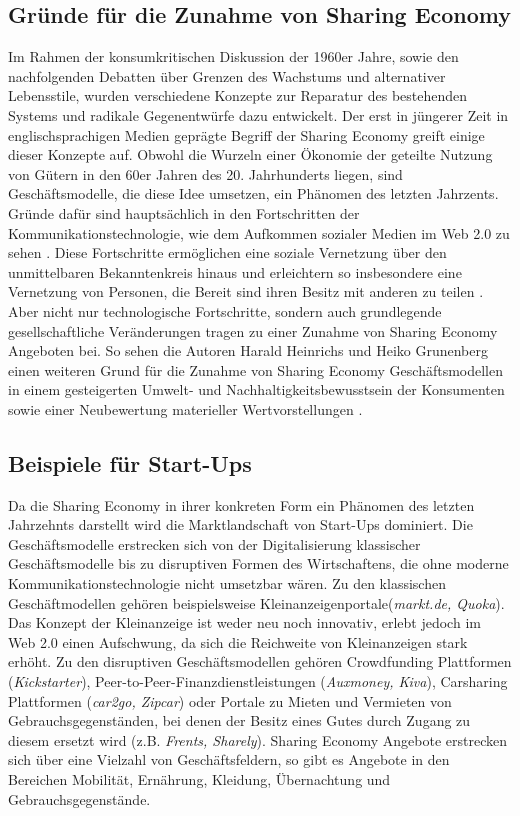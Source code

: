 \documentclass[a4paper]{scrartcl}
\begin{document}
\begin{multicols}{2}
		\subsection{Gr\"unde f\"ur die Zunahme von Sharing Economy}
			Im Rahmen der konsumkritischen Diskussion der 1960er Jahre, sowie den nachfolgenden Debatten über Grenzen des Wachstums und alternativer Lebensstile, wurden verschiedene Konzepte zur Reparatur des bestehenden Systems und radikale Gegenentw\"urfe dazu entwickelt\cite{heinrichs2012}. Der erst in jüngerer Zeit in englischsprachigen Medien gepr\"agte Begriff der Sharing Economy greift einige dieser Konzepte auf. Obwohl die Wurzeln einer \"Okonomie der geteilte Nutzung von G\"utern in den 60er Jahren des 20. Jahrhunderts liegen, sind Gesch\"aftsmodelle, die diese Idee umsetzen, ein Ph\"anomen des letzten Jahrzents. Gr\"unde daf\"ur sind haupts\"achlich in den Fortschritten der Kommunikationstechnologie, wie dem Aufkommen sozialer Medien im Web 2.0 zu sehen \cite{doi:10.1002/asi.23552, heinrichs2012}. Diese Fortschritte erm\"oglichen eine  soziale Vernetzung \"uber den unmittelbaren Bekanntenkreis hinaus und erleichtern so insbesondere eine Vernetzung von Personen, die Bereit sind ihren Besitz mit anderen zu teilen \cite{matzler2014}. Aber nicht nur technologische Fortschritte, sondern auch grundlegende gesellschaftliche Ver\"anderungen tragen zu einer Zunahme von Sharing Economy Angeboten bei. So sehen die Autoren Harald Heinrichs und Heiko Grunenberg einen weiteren Grund f\"ur die Zunahme von Sharing Economy Gesch\"aftsmodellen in einem gesteigerten Umwelt- und Nachhaltigkeitsbewusstsein der Konsumenten sowie einer Neubewertung materieller Wertvorstellungen \cite{heinrichs2012}.
	
		\subsection{Beispiele f\"ur Start-Ups}
			Da die Sharing Economy in ihrer konkreten Form ein Ph\"anomen des letzten Jahrzehnts darstellt wird die Marktlandschaft von Start-Ups dominiert. Die Gesch\"aftsmodelle erstrecken sich von der Digitalisierung klassischer Gesch\"aftsmodelle bis zu disruptiven Formen des Wirtschaftens, die ohne moderne Kommunikationstechnologie nicht umsetzbar w\"aren. Zu den klassischen Gesch\"aftmodellen geh\"oren beispielsweise Kleinanzeigenportale(\textit{markt.de, Quoka}). Das Konzept der Kleinanzeige ist weder neu noch innovativ, erlebt jedoch im Web 2.0 einen Aufschwung, da sich die Reichweite von Kleinanzeigen stark erh\"oht. Zu den disruptiven Gesch\"aftsmodellen geh\"oren Crowdfunding Plattformen (\textit{Kickstarter}), Peer-to-Peer-Finanzdienstleistungen (\textit{Auxmoney, Kiva}), Carsharing Plattformen (\textit{car2go, Zipcar}) oder Portale zu Mieten und Vermieten von Gebrauchsgegenst\"anden, bei denen der Besitz eines Gutes durch Zugang zu diesem ersetzt wird (z.B. \textit{Frents, Sharely}). Sharing Economy Angebote erstrecken sich \"uber eine Vielzahl von Gesch\"aftsfeldern, so gibt es Angebote in den Bereichen Mobilit\"at, Ern\"ahrung, Kleidung, \"Ubernachtung und Gebrauchsgegenst\"ande.
	

\end{multicols}
\end{document}
